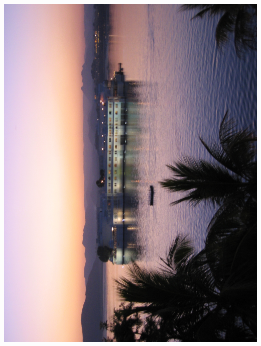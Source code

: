 %
\newpage\vspace*{-5cm}
\thispagestyle{empty}
\hspace*{-3.5cm}
\includegraphics[width=15.9cm]{articles/pagesCentrales/inde304.jpg}

